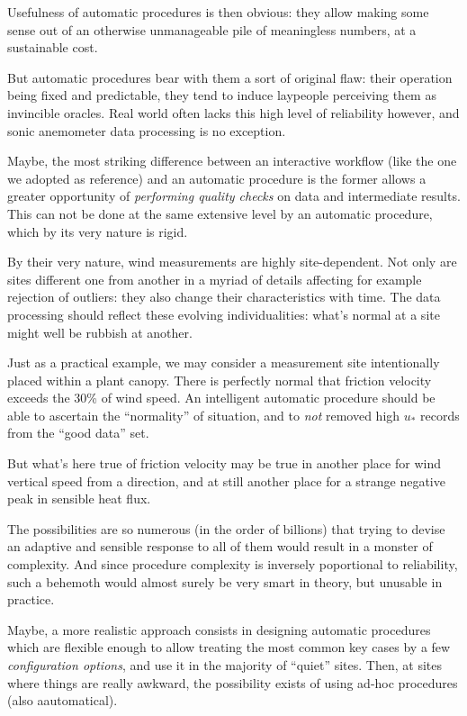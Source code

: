 \documentclass[a4paper,10pt]{book}
\begin{document}
Usefulness of automatic procedures is then obvious: they allow making some sense out of an otherwise unmanageable pile of meaningless numbers, at a sustainable cost.

But automatic procedures bear with them a sort of original flaw: their operation being fixed and predictable, they tend to induce laypeople perceiving them as invincible oracles. Real world often lacks this high level of reliability however, and sonic anemometer data processing is no exception.

Maybe, the most striking difference between an interactive workflow (like the one we adopted as reference) and an automatic procedure is the former allows a greater opportunity of \emph{performing quality checks} on data and intermediate results. This can not be done at the same extensive level by an automatic procedure, which by its very nature is rigid.

By their very nature, wind measurements are highly site-dependent. Not only are sites different one from another in a myriad of details affecting for example rejection of outliers: they also change their characteristics with time. The data processing should reflect these evolving individualities: what's normal at a site might well be rubbish at another.

Just as a practical example, we may consider a measurement site intentionally placed within a plant canopy. There is perfectly normal that friction velocity exceeds the 30\% of wind speed. An intelligent automatic procedure should be able to ascertain the ``normality'' of situation, and to \emph{not} removed high $u_{*}$ records from the ``good data'' set.

But what's here true of friction velocity may be true in another place for wind vertical speed from a direction, and at still another place for a strange negative peak in sensible heat flux.

The possibilities are so numerous (in the order of billions) that trying to devise an adaptive and sensible response to all of them would result in a monster of complexity. And since procedure complexity is inversely poportional to reliability, such a behemoth would almost surely be very smart in theory, but unusable in practice.

Maybe, a more realistic approach consists in designing automatic procedures which are flexible enough to allow treating the most common key cases by a few \emph{configuration options}, and use it in the majority of ``quiet'' sites. Then, at sites where things are really awkward, the possibility exists of using ad-hoc procedures (also aautomatical).
\end{document}

